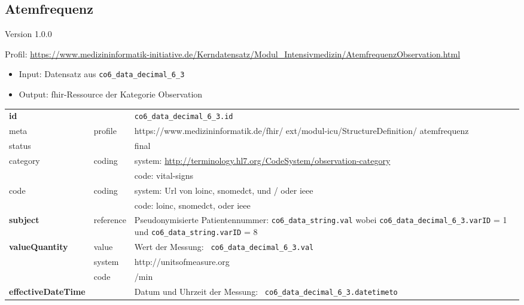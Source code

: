 \subsection{Atemfrequenz} 
\noindent Version 1.0.0

\noindent Profil: \url{https://www.medizininformatik-initiative.de/Kerndatensatz/Modul_Intensivmedizin/AtemfrequenzObservation.html}

\begin{itemize}
\item Input: Datensatz aus \texttt{co6\_data\_decimal\_6\_3}
\item Output: \ac{fhir}-Ressource der Kategorie \glqq Observation\grqq{}
\end{itemize}

\begin{longtable}{|l|l|p{7.5cm}|}
        \hline
        \rowcolor{lightgray} \multicolumn{3}{|l|}{Data Mapping (inhaltlich)} \\ \hline
        \textbf{id} &  & \texttt{co6\_data\_decimal\_6\_3.id} \\ \hline
	meta & profile & https://www.medizininformatik.de/fhir/ ext/modul-icu/StructureDefinition/ atemfrequenz \\ \hline 
	status &  & final   \\ \hline 
	category & coding & system: \url{http://terminology.hl7.org/CodeSystem/observation-category} \\
\cline{3-3}
	& & code: vital-signs\\ \hline
	code & coding & system: Url von \ac{loinc}, \ac{snomedct}, und / oder \ac{ieee} \\ 
	\cline{3-3} 
	 &  & code: \ac{loinc}, \ac{snomedct}, oder \ac{ieee} \\ \hline
	 \textbf{subject} & reference & Pseudonymisierte Patientennummer: \texttt{co6\_data\_string.val} wobei \texttt{co6\_data\_decimal\_6\_3.varID} = 1 und \texttt{co6\_data\_string.varID} = 8 \\ \hline
	 \textbf{valueQuantity}  & value & Wert der Messung: \texttt{
co6\_data\_decimal\_6\_3.val} \\
        \cline{2-3}
         & system & http://unitsofmeasure.org \\
         \cline{2-3}
         & code & /min
\\ \hline
     \textbf{effectiveDateTime}  & & Datum und Uhrzeit der Messung: \texttt{
co6\_data\_decimal\_6\_3.datetimeto} \\ \hline
\end{longtable}

